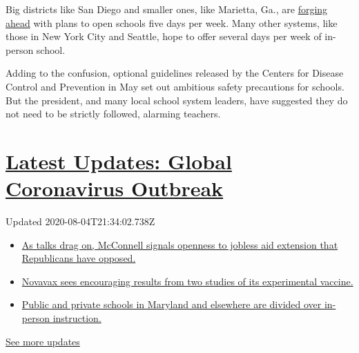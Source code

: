 Big districts like San Diego and smaller ones, like Marietta, Ga., are
\href{https://www.nytimes3xbfgragh.onion/2020/07/09/us/schools-reopening-trump.html}{forging
ahead} with plans to open schools five days per week. Many other
systems, like those in New York City and Seattle, hope to offer several
days per week of in-person school.

Adding to the confusion, optional guidelines released by the Centers for
Disease Control and Prevention in May set out ambitious safety
precautions for schools. But the president, and many local school system
leaders, have suggested they do not need to be strictly followed,
alarming teachers.

\hypertarget{latest-updates-global-coronavirus-outbreak}{%
\section{\texorpdfstring{\href{https://www.nytimes3xbfgragh.onion/2020/08/04/world/coronavirus-cases.html?action=click\&pgtype=Article\&state=default\&region=MAIN_CONTENT_1\&context=storylines_live_updates}{Latest
Updates: Global Coronavirus
Outbreak}}{Latest Updates: Global Coronavirus Outbreak}}\label{latest-updates-global-coronavirus-outbreak}}

Updated 2020-08-04T21:34:02.738Z

\begin{itemize}
\tightlist
\item
  \href{https://www.nytimes3xbfgragh.onion/2020/08/04/world/coronavirus-cases.html?action=click\&pgtype=Article\&state=default\&region=MAIN_CONTENT_1\&context=storylines_live_updates\#link-2daa96b5}{As
  talks drag on, McConnell signals openness to jobless aid extension
  that Republicans have opposed.}
\item
  \href{https://www.nytimes3xbfgragh.onion/2020/08/04/world/coronavirus-cases.html?action=click\&pgtype=Article\&state=default\&region=MAIN_CONTENT_1\&context=storylines_live_updates\#link-1228a480}{Novavax
  sees encouraging results from two studies of its experimental
  vaccine.}
\item
  \href{https://www.nytimes3xbfgragh.onion/2020/08/04/world/coronavirus-cases.html?action=click\&pgtype=Article\&state=default\&region=MAIN_CONTENT_1\&context=storylines_live_updates\#link-4825b93}{Public
  and private schools in Maryland and elsewhere are divided over
  in-person instruction.}
\end{itemize}

\href{https://www.nytimes3xbfgragh.onion/2020/08/04/world/coronavirus-cases.html?action=click\&pgtype=Article\&state=default\&region=MAIN_CONTENT_1\&context=storylines_live_updates}{See
more updates}

